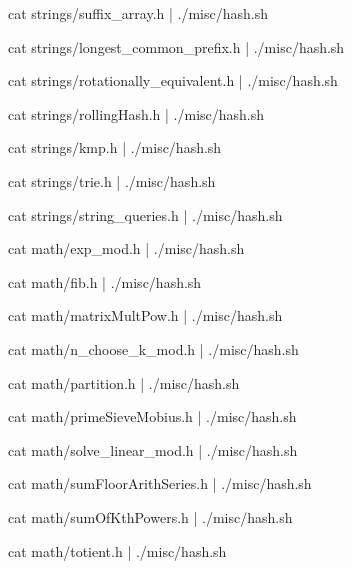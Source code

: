 \documentclass[12pt,letterpaper,twocolumn,landscape]{article}
\begin{document}

cat strings/suffix_array.h | ./misc/hash.sh
\END

cat strings/longest_common_prefix.h | ./misc/hash.sh
\END

cat strings/rotationally_equivalent.h | ./misc/hash.sh
\END

cat strings/rollingHash.h | ./misc/hash.sh
\END

cat strings/kmp.h | ./misc/hash.sh
\END

cat strings/trie.h | ./misc/hash.sh
\END

cat strings/string_queries.h | ./misc/hash.sh
\END



cat math/exp_mod.h | ./misc/hash.sh
\END

cat math/fib.h | ./misc/hash.sh
\END

cat math/matrixMultPow.h | ./misc/hash.sh
\END

cat math/n_choose_k_mod.h | ./misc/hash.sh
\END

cat math/partition.h | ./misc/hash.sh
\END

cat math/primeSieveMobius.h | ./misc/hash.sh
\END

cat math/solve_linear_mod.h | ./misc/hash.sh
\END

cat math/sumFloorArithSeries.h | ./misc/hash.sh
\END

cat math/sumOfKthPowers.h | ./misc/hash.sh
\END

cat math/totient.h | ./misc/hash.sh
\END

\end{document}
